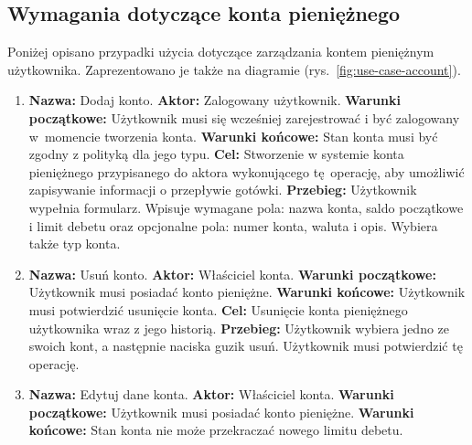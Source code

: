 \subsection{Wymagania dotyczące konta pieniężnego}
\label{subsec:wymagania-konto}
Poniżej opisano przypadki użycia dotyczące zarządzania kontem pieniężnym użytkownika. Zaprezentowano je także na diagramie (rys.~\ref{fig:use-case-account}).
\begin{enumerate}[labelwidth=1em,label=\arabic*.]
\item \textbf{Nazwa:} Dodaj konto. \newline
    \textbf{Aktor:} Zalogowany użytkownik. \newline
    \textbf{Warunki początkowe:} Użytkownik musi się wcześniej zarejestrować i być zalogowany w~momencie tworzenia konta. \newline
    \textbf{Warunki końcowe:} Stan konta musi być zgodny z polityką dla jego typu. \newline
    \textbf{Cel:} Stworzenie w systemie konta pieniężnego przypisanego do aktora wykonującego tę~operację, aby umożliwić zapisywanie informacji o przepływie gotówki. \newline
    \textbf{Przebieg:} Użytkownik wypełnia formularz. Wpisuje wymagane pola: nazwa konta, saldo początkowe i limit debetu oraz opcjonalne pola: numer konta, waluta i opis. Wybiera także typ konta.
\item \textbf{Nazwa:} Usuń konto. \newline
    \textbf{Aktor:} Właściciel konta. \newline
    \textbf{Warunki początkowe:} Użytkownik musi posiadać konto pieniężne. \newline
    \textbf{Warunki końcowe:} Użytkownik musi potwierdzić usunięcie konta. \newline
    \textbf{Cel:} Usunięcie konta pieniężnego użytkownika wraz z jego historią. \newline
    \textbf{Przebieg:} Użytkownik wybiera jedno ze swoich kont, a następnie naciska guzik usuń. Użytkownik musi potwierdzić tę operację.
\item \textbf{Nazwa:} Edytuj dane konta. \newline
    \textbf{Aktor:} Właściciel konta. \newline
    \textbf{Warunki początkowe:} Użytkownik musi posiadać konto pieniężne. \newline
    \textbf{Warunki końcowe:} Stan konta nie może przekraczać nowego limitu debetu. \newline

\end{enumerate}
